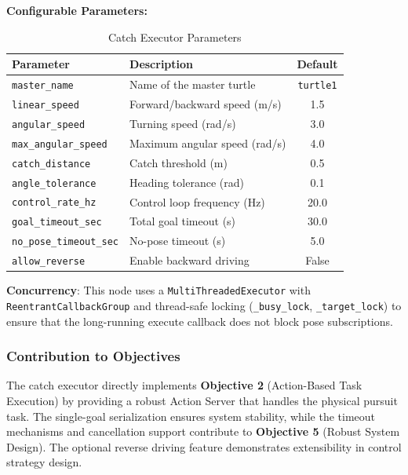 \documentclass[12pt,a4paper]{article}
\begin{document}
\textbf{Configurable Parameters:}

\begin{table}[H]
\centering
\caption{Catch Executor Parameters}
\begin{tabular}{llc}
\toprule
\textbf{Parameter} & \textbf{Description} & \textbf{Default} \\
\midrule
\texttt{master\_name} & Name of the master turtle & \texttt{turtle1} \\
\texttt{linear\_speed} & Forward/backward speed (m/s) & 1.5 \\
\texttt{angular\_speed} & Turning speed (rad/s) & 3.0 \\
\texttt{max\_angular\_speed} & Maximum angular speed (rad/s) & 4.0 \\
\texttt{catch\_distance} & Catch threshold (m) & 0.5 \\
\texttt{angle\_tolerance} & Heading tolerance (rad) & 0.1 \\
\texttt{control\_rate\_hz} & Control loop frequency (Hz) & 20.0 \\
\texttt{goal\_timeout\_sec} & Total goal timeout (s) & 30.0 \\
\texttt{no\_pose\_timeout\_sec} & No-pose timeout (s) & 5.0 \\
\texttt{allow\_reverse} & Enable backward driving & False \\
\bottomrule
\end{tabular}
\end{table}

\textbf{Concurrency}: This node uses a \texttt{MultiThreadedExecutor} with \texttt{ReentrantCallbackGroup} and thread-safe locking (\texttt{\_busy\_lock}, \texttt{\_target\_lock}) to ensure that the long-running execute callback does not block pose subscriptions.

\subsubsection{Contribution to Objectives}

The catch executor directly implements \textbf{Objective 2} (Action-Based Task Execution) by providing a robust Action Server that handles the physical pursuit task. The single-goal serialization ensures system stability, while the timeout mechanisms and cancellation support contribute to \textbf{Objective 5} (Robust System Design). The optional reverse driving feature demonstrates extensibility in control strategy design.

\end{document}
